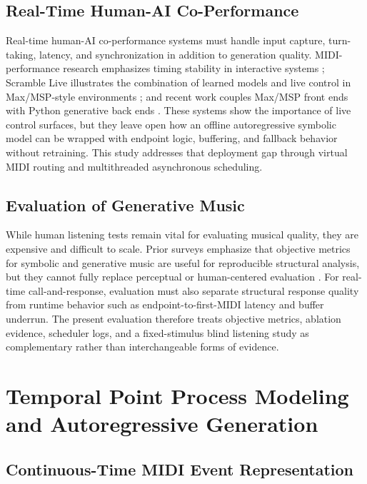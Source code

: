 \documentclass[11pt,a4paper]{article}
\begin{document}
\subsection{Real-Time Human-AI Co-Performance}

Real-time human-AI co-performance systems must handle input capture, turn-taking, latency, and synchronization in addition to generation quality. MIDI-performance research emphasizes timing stability in interactive systems \citep{nelson2004midi}; Scramble Live illustrates the combination of learned models and live control in Max/MSP-style environments \citep{privato2022scramble}; and recent work couples Max/MSP front ends with Python generative back ends \citep{karchkhadze2026towards}. These systems show the importance of live control surfaces, but they leave open how an offline autoregressive symbolic model can be wrapped with endpoint logic, buffering, and fallback behavior without retraining. This study addresses that deployment gap through virtual MIDI routing and multithreaded asynchronous scheduling.

\subsection{Evaluation of Generative Music}

While human listening tests remain vital for evaluating musical quality, they are expensive and difficult to scale. Prior surveys emphasize that objective metrics for symbolic and generative music are useful for reproducible structural analysis, but they cannot fully replace perceptual or human-centered evaluation \citep{ji2023survey,lerch2025evaluation}. For real-time call-and-response, evaluation must also separate structural response quality from runtime behavior such as endpoint-to-first-MIDI latency and buffer underrun. The present evaluation therefore treats objective metrics, ablation evidence, scheduler logs, and a fixed-stimulus blind listening study as complementary rather than interchangeable forms of evidence.

\section{Temporal Point Process Modeling and Autoregressive Generation}
\label{sec:temporal-modeling}

\subsection{Continuous-Time MIDI Event Representation}
\end{document}
